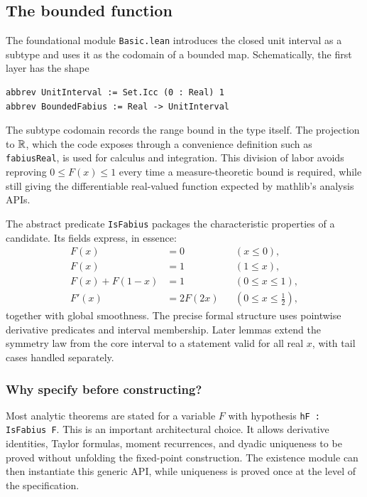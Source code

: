 \documentclass[11pt,oneside]{article}
\theoremstyle{definition}
\theoremstyle{remark}
\begin{document}
\subsection{The bounded function}
The foundational module \nolinkurl{Basic.lean} introduces the closed unit interval as a subtype and uses it as the codomain of a bounded map.  Schematically, the first layer has the shape
\begin{lstlisting}[style=pseudo]
abbrev UnitInterval := Set.Icc (0 : Real) 1
abbrev BoundedFabius := Real -> UnitInterval
\end{lstlisting}
The subtype codomain records the range bound in the type itself.  The projection to \(\mathbb{R}\), which the code exposes through a convenience definition such as \nolinkurl{fabiusReal}, is used for calculus and integration.  This division of labor avoids reproving \(0\leq F(x)\leq1\) every time a measure-theoretic bound is required, while still giving the differentiable real-valued function expected by mathlib's analysis APIs.

The abstract predicate \nolinkurl{IsFabius} packages the characteristic properties of a candidate.  Its fields express, in essence:
\begin{align*}
 F(x)&=0 &&(x\leq0),\\
 F(x)&=1 &&(1\leq x),\\
 F(x)+F(1-x)&=1 &&(0\leq x\leq1),\\
 F'(x)&=2F(2x) &&(0\leq x\leq\tfrac12),
\end{align*}
together with global smoothness.  The precise formal structure uses pointwise derivative predicates and interval membership.  Later lemmas extend the symmetry law from the core interval to a statement valid for all real \(x\), with tail cases handled separately.

\subsubsection{Why specify before constructing?}
Most analytic theorems are stated for a variable \(F\) with hypothesis \nolinkurl{hF : IsFabius F}.  This is an important architectural choice.  It allows derivative identities, Taylor formulas, moment recurrences, and dyadic uniqueness to be proved without unfolding the fixed-point construction.  The existence module can then instantiate this generic API, while uniqueness is proved once at the level of the specification.
\end{document}
